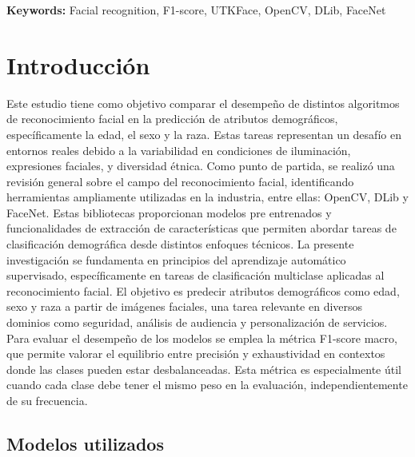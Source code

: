 \textbf{Keywords:} Facial recognition, F1-score, UTKFace, OpenCV, DLib, FaceNet


\newpage
\section{Introducción}
Este estudio tiene como objetivo comparar el desempeño de distintos algoritmos de reconocimiento facial en la predicción de atributos demográficos, específicamente la edad, el sexo y la raza. Estas tareas representan un desafío en entornos reales debido a la variabilidad en condiciones de iluminación, expresiones faciales, y diversidad étnica. Como punto de partida, se realizó una revisión general sobre el campo del reconocimiento facial, identificando herramientas ampliamente utilizadas en la industria, entre ellas: OpenCV, DLib y FaceNet. Estas bibliotecas proporcionan modelos pre entrenados y funcionalidades de extracción de características que permiten abordar tareas de clasificación demográfica desde distintos enfoques técnicos. La presente investigación se fundamenta en principios del aprendizaje automático supervisado, específicamente en tareas de clasificación multiclase aplicadas al reconocimiento facial. El objetivo es predecir atributos demográficos como edad, sexo y raza a partir de imágenes faciales, una tarea relevante en diversos dominios como seguridad, análisis de audiencia y personalización de servicios.
Para evaluar el desempeño de los modelos se emplea la métrica F1-score macro, que permite valorar el equilibrio entre precisión y exhaustividad en contextos donde las clases pueden estar desbalanceadas. Esta métrica es especialmente útil cuando cada clase debe tener el mismo peso en la evaluación, independientemente de su frecuencia.

\subsection{Modelos utilizados}

